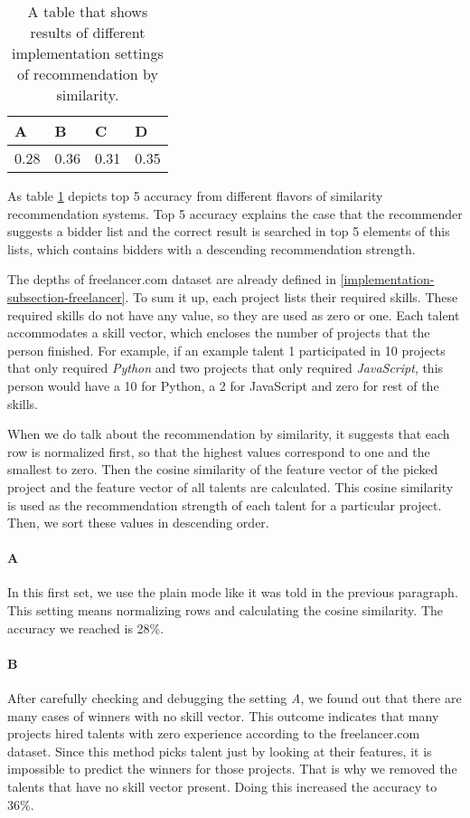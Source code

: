 \begin{table}[htp]
	\caption[Evaluation results of different hybrid settings]{A table that shows results of different implementation settings of recommendation by similarity.}\label{tab:evaluation-rec-similarity}
	\centering
	\begin{tabular}{l l l l}
		\toprule
		A & B & C & D \\
		\midrule
		0.28 & 0.36 & 0.31 & 0.35 \\
		\bottomrule
	\end{tabular}
\end{table}

As table \ref{tab:evaluation-rec-similarity} depicts top 5 accuracy from different flavors of similarity recommendation systems. Top 5 accuracy explains the case that the recommender suggests a bidder list and the correct result is searched in top 5 elements of this lists, which contains bidders with a descending recommendation strength. 

The depths of freelancer.com dataset are already defined in \ref{implementation-subsection-freelancer}. To sum it up, each project lists their required skills. These required skills do not have any value, so they are used as zero or one. Each talent accommodates a skill vector, which encloses the number of projects that the person finished. For example, if an example talent 1 participated in 10 projects that only required \textit{Python} and two projects that only required \textit{JavaScript}, this person would have a 10 for Python, a 2 for JavaScript and zero for rest of the skills. 

When we do talk about the recommendation by similarity, it suggests that each row is normalized first, so that the highest values correspond to one and the smallest to zero. Then the cosine similarity of the feature vector of the picked project and the feature vector of all talents are calculated. This cosine similarity is used as the recommendation strength of each talent for a particular project. Then, we sort these values in descending order. 

\paragraph{A} In this first set, we use the plain mode like it was told in the previous paragraph. This setting means normalizing rows and calculating the cosine similarity. The accuracy we reached is 28\%. 

\paragraph{B} After carefully checking and debugging the setting \textit{A}, we found out that there are many cases of winners with no skill vector. This outcome indicates that many projects hired talents with zero experience according to the freelancer.com dataset. Since this method picks talent just by looking at their features, it is impossible to predict the winners for those projects. That is why we removed the talents that have no skill vector present. Doing this increased the accuracy to 36\%. 

